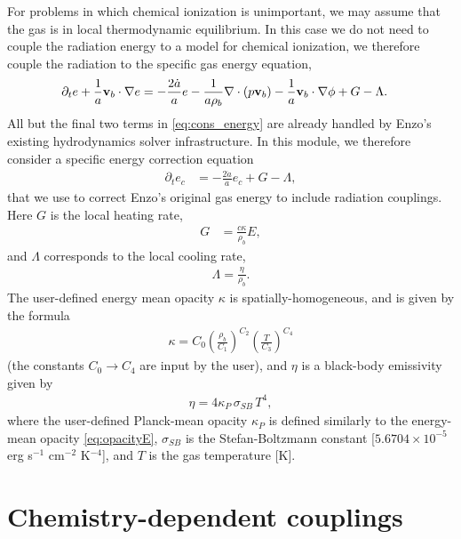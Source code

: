 \documentclass[letterpaper,10pt]{article}
\renewcommand{\(}{\left(}
\renewcommand{\)}{\right)}
\newcommand{\vb}{{\bf v}_b}
\newcommand{\rhob}{\rho_b}
\begin{document}
For problems in which chemical ionization is unimportant, we may
assume that the gas is in local thermodynamic equilibrium.  In this
case we do not need to couple the radiation energy to a model for
chemical ionization, we therefore couple the radiation to the specific
gas energy equation, 
\begin{align}
  \label{eq:cons_energy}
  \partial_t e + \frac1a\vb\cdot\nabla e &=
    - \frac{2\dot{a}}{a}e
    - \frac{1}{a\rhob}\nabla\cdot\left(p\vb\right) 
    - \frac1a\vb\cdot\nabla\phi + G - \Lambda.
\end{align}
All but the final two terms in \eqref{eq:cons_energy} are already
handled by Enzo's existing hydrodynamics solver infrastructure.  In
this module, we therefore consider a specific energy correction equation 
\begin{align}
  \label{eq:cons_energy_correction}
  \partial_t e_c &= -\frac{2\dot{a}}{a}e_c + G - \Lambda,
\end{align}
that we use to correct Enzo's original gas energy to include radiation
couplings.  Here $G$ is the local heating rate,
\begin{align}
\label{eq:G_LTE}
  G &= \frac{c \kappa}{\rhob} E,
\end{align}
and $\Lambda$ corresponds to the local cooling rate,
\begin{align}
\label{eq:Lambda_LTE}
  \Lambda = \frac{\eta}{\rhob}.
\end{align}
The user-defined energy mean opacity $\kappa$ is
spatially-homogeneous, and is given by the formula
\begin{align}
\label{eq:opacityE}
  \kappa = C_0 \left(\frac{\rhob}{C_1}\right)^{C_2}
    \left(\frac{T}{C_3}\right)^{C_4} 
\end{align}
(the constants $C_0\to C_4$ are input by the user), and $\eta$ is
a black-body emissivity given by 
\begin{align}
\label{eq:etaBB}
  \eta = 4\kappa_P\,\sigma_{SB}\,T^4,
\end{align}
where the user-defined Planck-mean opacity $\kappa_P$ is defined
similarly to the energy-mean opacity \eqref{eq:opacityE},
$\sigma_{SB}$ is the Stefan-Boltzmann constant [$5.6704\times 10^{-5}$
erg s$^{-1}$ cm$^{-2}$ K$^{-4}$], and $T$ is the gas temperature [K].



\section{Chemistry-dependent couplings}
\label{sec:chem_model}
\end{document}
